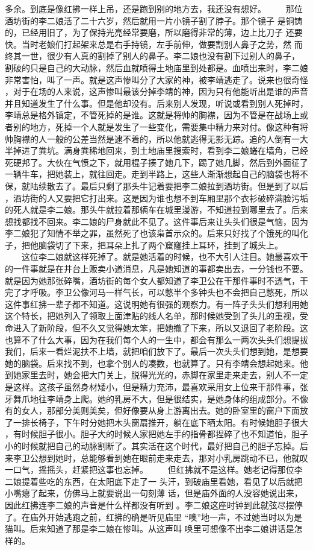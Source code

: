 多余。到底是像红拂一样上吊，还是跑到别的地方去，我还没有想好。 　　那位酒坊街的李二娘活了二十六岁，然后就用一片小镜子割了脖子。那个镜子 是铜铸的，已经用旧了，为了保持光亮经常要磨，所以磨得非常的薄，边上比刀子 还要快。当时老娘们打起架来总是右手持镜，左手前伸，做要割别人鼻子之势，然 而终其一世，很少有人真的割掉了别人的鼻子。李二娘也没有割下过别人的鼻子， 割破的只是自己的大动脉，然后血就喷得土地庙里到处都是。血喷出来时，李二娘 非常害怕，叫了一声。就是这声惨叫分了大家的神，被李靖逃走了。说来也很奇怪 ，对于在场的人来说，这声惨叫最该分掉李靖的神，因为只有他能听出是谁的声音 并且知道发生了什么事。但是他却没有。后来别人发现，听说或看到别人死掉时， 李靖总是格外镇定，不管死掉的是谁。这就是将帅的胸襟，因为不管是在战场上或 者别的地方，死掉一个人就是发生了一些变化，需要集中精力来对付。像这种有将 帅胸襟的人一般的公差当然是逮不着的，所以他就逃得无影无踪。追的人倒有一大 半掉进了粪坑。满身粪稀地回来，到土地庙里搜索时，看到李二娘蜷在墙角，已经 死硬邦了。大伙在气愤之下，就用棍子揍了她几下，踢了她几脚，然后到外面征了 一辆牛车，把她装上，就往回走。走到半路上，这些人渐渐想起自己的脑袋也将不 保，就陆续散去了。最后只剩了那头牛记着要把李二娘拉到酒坊街。但是到了以后 ，酒坊街的人又要把它打出来。这是因为谁也想不到车厢里那个衣衫破碎满脸污垢 的死人就是李二娘。那头牛就拉着那辆车在城里漫游，不知道拉到哪里去了。后来 想找都找不回来。李二娘的尸身就此不见了。这件事后来让头头们很是气恼，因为 李二娘犯了知情不举之罪，虽然死了也该枭首示众的。后来只好找了个饿死的叫化 子，把他脑袋切了下来，把耳朵上扎了两个窟窿挂上耳环，挂到了城头上。 　　这位李二娘就这样死掉了。就是她活着的时候，也不大引人注目。她最喜欢干 的一件事就是在井台上贩卖小道消息，凡是她知道的事都卖出去，一分钱也不要。 就是因为她那张碎嘴，酒坊街的每个女人都知道了李卫公在干那件事时不透气，干 完了才呼吸。李卫公像河马一样气长，可以憋半个多钟头也不会把自己憋死，所以 这件事红拂一辈子都不知道。这说明她有很强的观察力。有一阵子头头们想利用她 这个特长，把她列入了领取上面津贴的线人名单，那时候她受到了头儿的重视，受 命进入了新阶段，但不久又觉得她太笨，把她撤了下来，所以又退回了老阶段。这 也算不了什么大事，因为在我们每个人的一生中，都会有那么一两次头头们想提拔 我们，后来一看烂泥扶不上墙，就把咱们放下了。最后一次头头们想到她，是想要 她的脑袋。后来找不到，也拿个别人的凑数，也就算了。只有李靖会想起她来。他 到她家里去时，她会把大门关上，脱得光光的，赤脚在家里走来走去，别人不一定 是这样。这孩子虽然身材矮小，但是精力充沛，最喜欢采用女上位来干那件事，张 牙舞爪地往李靖身上爬。她的乳房不大，但是很结实，是她身体的组成部分。不像 有的女人，那部分美则美矣，但好像要从身上游离出去。她的卧室里的窗户下面放 了一排长椅子，下午时分她把木头窗扇推开，躺在底下晒太阳。有时候她胆子很大 ，有时候胆子很小。胆子大的时候人家把她左手的指骨都捏碎了也不知道怕，胆子 小的时候就把自己的动脉割断了。其实活在这个时代，最好把自己的胆子忘掉。后 来李卫公想到她时，总能够看到她在眼前走来走去，那对小乳房跳动不已，他就叹 一口气，摇摇头，赶紧把这事也忘掉。 　　但红拂就不是这样。她老记得那位李二娘提着些吃的东西，在太阳底下走了一 头汗，到破庙里看她，看见了以后就把小嘴瘪了起来，仿佛马上就要说出一句刻薄 话，但是庙外面的人没容她说出来，因此红拂连李二娘的声音是什么样都没有听到 。李二娘这座时钟到此就弦尽摆停了。在庙外开始逃跑之前，红拂的确是听见庙里 “噢”地一声，不过她当时以为是猫叫。后来知道了那是李二娘在惨叫。从这声叫 唤里可想像不出李二娘讲话是怎样的。 
 

